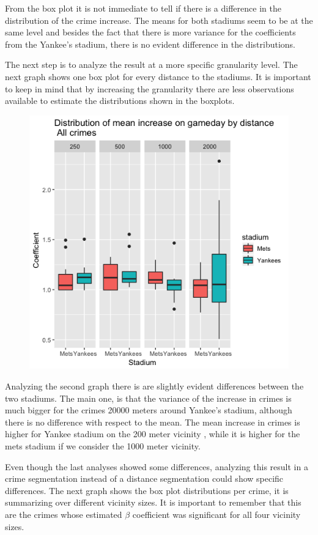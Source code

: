 \documentclass{article}
\begin{document}
From the box plot it is not immediate to  tell if there is a difference in the distribution of the crime increase. The means for both stadiums seem to be at the same level and besides the fact that there is more variance for the coefficients from the Yankee's stadium, there is no evident difference in the distributions. 

The next step is to analyze the result at a more specific granularity level. The next graph shows one box plot for every distance to the stadiums. It is important to keep in mind that by increasing the granularity there are less observations available to estimate the distributions shown in the boxplots.   

\begin{figure}[H]
\centering
\includegraphics[scale=0.5]{box_4.png}
\end{figure}

Analyzing  the second graph there is are slightly evident differences between the two stadiums. The main one, is that the variance of the increase in crimes is much bigger for the crimes 20000 meters around Yankee's stadium, although there is no difference with respect to the mean. The mean increase in crimes is higher for Yankee stadium on the 200 meter vicinity , while it is higher for the mets stadium if we consider the 1000 meter vicinity. 

Even though  the last analyses showed some differences, analyzing this result in a crime segmentation instead of a distance segmentation could show specific differences. The next graph shows the box plot distributions per crime, it is summarizing over different vicinity sizes. It is important to remember that this are the crimes whose estimated $\beta$ coefficient was significant for all four vicinity sizes.  
\end{document}
